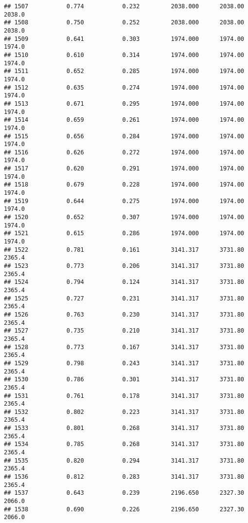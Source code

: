 \documentclass[
]{article}
\begin{document}
\begin{verbatim}
## 1507           0.774           0.232         2038.000      2038.00       2038.0
## 1508           0.750           0.252         2038.000      2038.00       2038.0
## 1509           0.641           0.303         1974.000      1974.00       1974.0
## 1510           0.610           0.314         1974.000      1974.00       1974.0
## 1511           0.652           0.285         1974.000      1974.00       1974.0
## 1512           0.635           0.274         1974.000      1974.00       1974.0
## 1513           0.671           0.295         1974.000      1974.00       1974.0
## 1514           0.659           0.261         1974.000      1974.00       1974.0
## 1515           0.656           0.284         1974.000      1974.00       1974.0
## 1516           0.626           0.272         1974.000      1974.00       1974.0
## 1517           0.620           0.291         1974.000      1974.00       1974.0
## 1518           0.679           0.228         1974.000      1974.00       1974.0
## 1519           0.644           0.275         1974.000      1974.00       1974.0
## 1520           0.652           0.307         1974.000      1974.00       1974.0
## 1521           0.615           0.286         1974.000      1974.00       1974.0
## 1522           0.781           0.161         3141.317      3731.80       2365.4
## 1523           0.773           0.206         3141.317      3731.80       2365.4
## 1524           0.794           0.124         3141.317      3731.80       2365.4
## 1525           0.727           0.231         3141.317      3731.80       2365.4
## 1526           0.763           0.230         3141.317      3731.80       2365.4
## 1527           0.735           0.210         3141.317      3731.80       2365.4
## 1528           0.773           0.167         3141.317      3731.80       2365.4
## 1529           0.798           0.243         3141.317      3731.80       2365.4
## 1530           0.786           0.301         3141.317      3731.80       2365.4
## 1531           0.761           0.178         3141.317      3731.80       2365.4
## 1532           0.802           0.223         3141.317      3731.80       2365.4
## 1533           0.801           0.268         3141.317      3731.80       2365.4
## 1534           0.785           0.268         3141.317      3731.80       2365.4
## 1535           0.820           0.294         3141.317      3731.80       2365.4
## 1536           0.812           0.283         3141.317      3731.80       2365.4
## 1537           0.643           0.239         2196.650      2327.30       2066.0
## 1538           0.690           0.226         2196.650      2327.30       2066.0

\end{verbatim}
\end{document}
